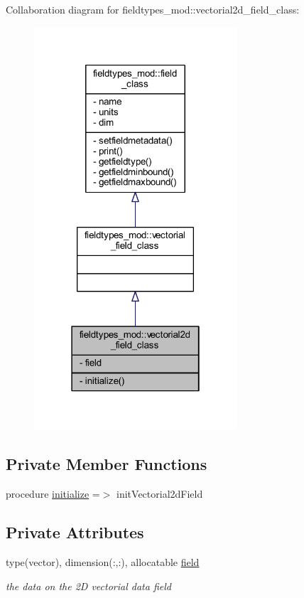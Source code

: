 Collaboration diagram for fieldtypes\+\_\+mod\+:\+:vectorial2d\+\_\+field\+\_\+class\+:\nopagebreak
\begin{figure}[H]
\begin{center}
\leavevmode
\includegraphics[width=214pt]{structfieldtypes__mod_1_1vectorial2d__field__class__coll__graph}
\end{center}
\end{figure}
\subsection*{Private Member Functions}
\begin{DoxyCompactItemize}
\item 
procedure \mbox{\hyperlink{structfieldtypes__mod_1_1vectorial2d__field__class_a78b96468a2b6db94a88fbe8b2d8ec044}{initialize}} =$>$ init\+Vectorial2d\+Field
\end{DoxyCompactItemize}
\subsection*{Private Attributes}
\begin{DoxyCompactItemize}
\item 
type(vector), dimension(\+:,\+:), allocatable \mbox{\hyperlink{structfieldtypes__mod_1_1vectorial2d__field__class_ac10c2c4dfbc504948d46922d7e133976}{field}}
\begin{DoxyCompactList}\small\item\em the data on the 2D vectorial data field \end{DoxyCompactList}\end{DoxyCompactItemize}


